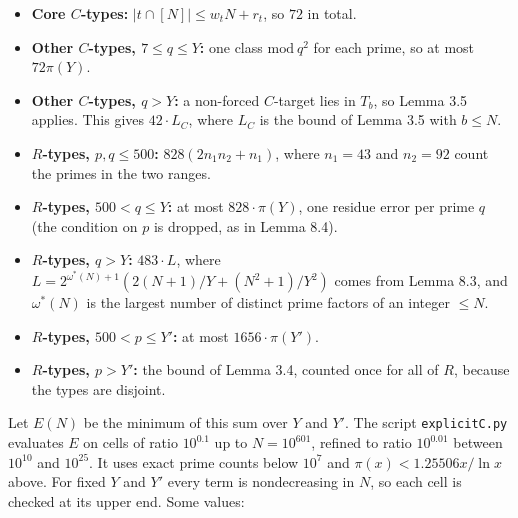 \documentclass[
  11pt,
]{article}
\providecommand{\tightlist}{%
  \setlength{\itemsep}{0pt}\setlength{\parskip}{0pt}}
\begin{document}
\begin{itemize}
\tightlist
\item
  \textbf{Core \(C\)-types:} \(|t \cap [N]| \le w_t N + r_t\), so \(72\)
  in total.
\item
  \textbf{Other \(C\)-types, \(7 \le q \le Y\):} one class
  \(\mathrm{mod}\ q^2\) for each prime, so at most \(72\pi(Y)\).
\item
  \textbf{Other \(C\)-types, \(q > Y\):} a non-forced \(C\)-target lies
  in \(T_b\), so Lemma 3.5 applies. This gives \(42\cdot L_C\), where
  \(L_C\) is the bound of Lemma 3.5 with \(b \le N\).
\item
  \textbf{\(R\)-types, \(p, q \le 500\):} \(828(2n_1n_2 + n_1)\), where
  \(n_1 = 43\) and \(n_2 = 92\) count the primes in the two ranges.
\item
  \textbf{\(R\)-types, \(500 < q \le Y\):} at most \(828\cdot\pi(Y)\),
  one residue error per prime \(q\) (the condition on \(p\) is dropped,
  as in Lemma 8.4).
\item
  \textbf{\(R\)-types, \(q > Y\):} \(483\cdot L\), where
  \(L = 2^{\omega^*(N)+1}(2(N+1)/Y + (N^2+1)/Y^2)\) comes from Lemma
  8.3, and \(\omega^*(N)\) is the largest number of distinct prime
  factors of an integer \(\le N\).
\item
  \textbf{\(R\)-types, \(500 < p \le Y'\):} at most
  \(1656\cdot\pi(Y')\).
\item
  \textbf{\(R\)-types, \(p > Y'\):} the bound of Lemma 3.4, counted once
  for all of \(R\), because the types are disjoint.
\end{itemize}

Let \(E(N)\) be the minimum of this sum over \(Y\) and \(Y'\). The
script \texttt{explicitC.py} evaluates \(E\) on cells of ratio
\(10^{0.1}\) up to \(N = 10^{601}\), refined to ratio \(10^{0.01}\)
between \(10^{10}\) and \(10^{25}\). It uses exact prime counts below
\(10^{7}\) and \(\pi(x) < 1.25506x/\ln x\) above. For fixed \(Y\) and
\(Y'\) every term is nondecreasing in \(N\), so each cell is checked at
its upper end. Some values:
\end{document}

